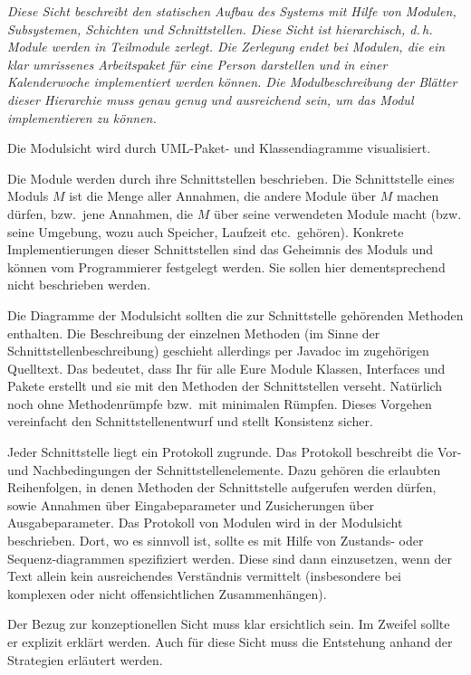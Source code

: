 \documentclass[fontsize=12pt,paper=a4,twoside]{scrartcl}
\begin{document}
{\itshape Diese Sicht beschreibt den statischen Aufbau des Systems mit Hilfe von
Modulen, Subsystemen, Schichten und Schnittstellen. Diese Sicht ist 
hierarchisch, d.\,h. Module werden in Teilmodule zerlegt. Die Zerlegung endet 
bei Modulen, die ein klar umrissenes Arbeitspaket für eine Person darstellen und
in einer Kalenderwoche implementiert werden können. Die Modulbeschreibung der 
Blätter dieser Hierarchie muss genau genug und ausreichend sein, um das Modul 
implementieren zu können.

Die Modulsicht wird durch {UML}-Paket- und Klassendiagramme visualisiert.

Die Module werden durch ihre Schnittstellen beschrieben.
Die Schnittstelle eines Moduls $M$ ist die Menge aller Annahmen, die andere 
Module über $M$ machen dürfen, bzw.\ jene Annahmen, die $M$ über seine 
verwendeten Module macht (bzw. seine Umgebung, wozu auch Speicher, Laufzeit 
etc.\ gehören).
Konkrete Implementierungen dieser Schnittstellen sind das Geheimnis des Moduls
und können vom Programmierer festgelegt werden. Sie sollen hier dementsprechend 
nicht beschrieben werden. 

Die Diagramme der Modulsicht sollten die zur Schnittstelle gehörenden Methoden
enthalten. Die Beschreibung der einzelnen Methoden (im Sinne der 
Schnittstellenbeschreibung) geschieht allerdings per Javadoc im zugehörigen 
Quelltext. Das bedeutet, dass Ihr für alle Eure Module Klassen, Interfaces und 
Pakete erstellt und sie mit den Methoden der Schnittstellen verseht. Natürlich 
noch ohne Methodenrümpfe bzw.\ mit minimalen Rümpfen. Dieses Vorgehen 
vereinfacht den Schnittstellenentwurf und stellt Konsistenz sicher.

Jeder Schnittstelle liegt ein Protokoll zugrunde. Das Protokoll beschreibt die 
Vor- und Nachbedingungen der Schnittstellenelemente. Dazu gehören die erlaubten
Reihenfolgen, in denen Methoden der Schnittstelle aufgerufen werden dürfen, 
sowie Annahmen über Eingabeparameter und Zusicherungen über Ausgabeparameter. 
Das Protokoll von Modulen wird in der Modulsicht beschrieben.
Dort, wo es sinnvoll ist, sollte es mit Hilfe von Zustands- oder 
Sequenz-diagrammen spezifiziert werden. Diese sind dann einzusetzen, wenn der
Text allein kein ausreichendes Verständnis vermittelt (insbesondere bei 
komplexen oder nicht offensichtlichen Zusammenhängen).

Der Bezug zur konzeptionellen Sicht muss klar ersichtlich sein. Im Zweifel 
sollte er explizit erklärt werden. Auch für diese Sicht muss die Entstehung 
anhand der Strategien erläutert werden.}
\end{document}

